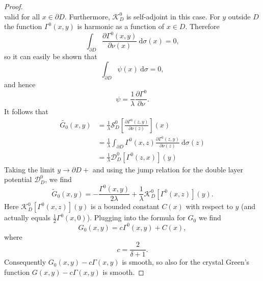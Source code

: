 \documentclass[a4paper]{article}
\theoremstyle{definition}
\renewcommand{\S}{\mathcal{S}}
\newcommand{\K}{\mathcal{K}}
\newcommand{\dx}{\: \mathrm{d}}
\begin{document}
\begin{proof}
\begin{equation*}
\end{equation*}
valid for all $x\in \partial D$. Furthermore, $\K_D^0$ is self-adjoint in this case. For $y$ outside $D$ the function $\Gamma^0(x,y)$ is harmonic as a function of $x\in D$. Therefore 
\begin{equation*}
\int_{\partial D} \frac{\partial \Gamma^0(x,y)}{\partial \nu(x)}\dx \sigma(x) = 0,
\end{equation*}
so it can easily be shown that 
\begin{equation*}
\int_{\partial D} \psi(x)\dx \sigma = 0,
\end{equation*}
and hence 
\begin{equation*}
\psi = \frac{1}{\lambda}\frac{\partial \Gamma^0}{\partial \nu}.
\end{equation*}
It follows that 
\begin{align*}
\tilde{G_0}(x,y) &= \frac{1}{\lambda}\S_D^0 \left[\frac{\partial \Gamma^0(z,y)}{\partial \nu(z)} \right](x) \\
&= \frac{1}{\lambda} \int_{\partial D} \Gamma^0(x,z) \frac{\partial \Gamma^0(z,y)}{\partial \nu(z)} \dx \sigma(z) \\
&=\frac{1}{\lambda}\mathcal{D}_D^0 \left[\Gamma^0(z,x)\right](y)
\end{align*}
Taking the limit $y\rightarrow \partial D+$ and using the jump relation for the double layer potential $\mathcal{D}_D^0$, we find
\begin{equation*}
\tilde{G}_0(x,y) = -\frac{\Gamma^0(x,y)}{2\lambda} + \frac{1}{\lambda}\K_D^0\left[\Gamma^0(x,z)\right](y).
\end{equation*}
Here $\K_D^0\left[\Gamma^0(x,z)\right](y)$ is a bounded constant $C(x)$ with respect to $y$ (and actually equals $\frac{1}{2}\Gamma^0(x,0)$). Plugging into the formula for $G_0$ we find
\begin{equation*}
G_0(x,y) = c\Gamma^0(x,y) + C(x),
\end{equation*}
where 
\begin{equation*}
c = \frac{2}{\delta+1}.
\end{equation*}
Consequently $G_0(x,y)-c\Gamma(x,y)$ is smooth, so also for the crystal Green's function $G(x,y)-c\Gamma(x,y)$ is smooth. 


\end{proof}
\end{document}
